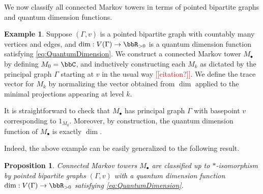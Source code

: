 \documentclass[11pt]{article}
\theoremstyle{plain}
\newtheorem{prop}[thm]{Proposition}
\theoremstyle{definition}
\newtheorem{ex}[thm]{Example}
\DeclareMathOperator{\tr}{tr}
\newcommand{\nn}[1]{\textcolor{red}{[[#1]]}}
\begin{document}
We now classify all connected Markov towers in terms of pointed bipartite graphs and quantum dimension functions.

\begin{ex}
Suppose $(\Gamma, v)$ is a pointed bipartite graph with countably many vertices and edges, and $\dim : V(\Gamma) \to \bbR_{>0}$ is a quantum dimension function satisfying \eqref{eq:QuantumDimension}.
We construct a connected Markov tower $M_\bullet$ by defining $M_0 = \bbC$, and inductively constructing each $M_k$ as dictated by the principal graph $\Gamma$ starting at $v$ in the usual way \nn{citation?}.
We define the trace vector for $M_k$ by normalizing the vector obtained from $\dim$ applied to the minimal projections appearing at level $k$.

It is straightforward to check that $M_\bullet$ has principal graph $\Gamma$ with basepoint $v$ corresponding to $1_{M_0}$.
Moreover, by construction, the quantum dimension function of $M_\bullet$ is exactly $\dim$.
\end{ex}

Indeed, the above example can be easily generalized to the following result.

\begin{prop}
\label{prop:ClassificationOfMarkovTowers}
Connected Markov towers $M_\bullet$ are classified up to $*$-isomorphism by pointed bipartite graphs $(\Gamma,v)$ with a quantum dimension function $\dim: V(\Gamma) \to \bbR_{>0}$ satisfying \eqref{eq:QuantumDimension}.
\end{prop}
%
%
\end{document}
